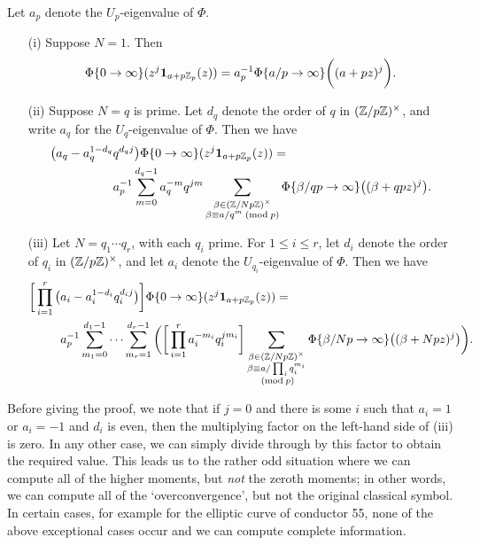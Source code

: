 \documentclass[a4paper,11pt]{article}
\numberwithin{equation}{section}
\begin{document}
\begin{proposition} Let $a_p$ denote the $U_p$-eigenvalue of $\Phi$.
\begin{itemize}
\item[(i)] Suppose $N = 1$. Then
\[
\Phi\{0\rightarrow\infty\}(z^j \mathbf{1}_{a+p\mathbb{Z}_p}(z)) = a_p^{-1}\Phi\{a/p \rightarrow \infty\}\bigg((a+pz)^j\bigg).
\]
\item[(ii)] Suppose $N = q$ is prime. Let $d_q$ denote the order of $q$ in $(\mathbb{Z}/p\mathbb{Z})^\times$, and write $a_q$ for the $U_q$-eigenvalue of $\Phi$. Then we have
\begin{align*}
\big(a_q -a_q^{1-d_q}&q^{d_qj}\big)\Phi\{0\rightarrow\infty\}(z^j \mathbf{1}_{a+p\Zp}(z)) =
\\
& a_p^{-1} \sum_{m = 0}^{d_q-1} a_q^{-m}q^{jm}%
\sum_{\substack{\beta \in (\Z/Np\Z)^\times\\ \beta \equiv a/q^m\newmod{p}}} \Phi\{\beta/qp\rightarrow \infty\}\big((\beta + qpz)^j\big).
\end{align*}

\item[(iii)]Let $N = q_1\cdots q_r$, with each $q_i$ prime. For $1\leq i \leq r$, let $d_i$ denote the order of $q_i$ in $(\mathbb{Z}/p\mathbb{Z})^\times$, and let $a_i$ denote the $U_{q_i}$-eigenvalue of $\Phi$. Then we have 
\begin{align*}
	\bigg[\prod_{i=1}^r\big(&a_i -a_i^{1-d_i}q_i^{d_ij}\big)\bigg]\Phi\{0\rightarrow\infty\}(z^j \mathbf{1}_{a+p\Zp}(z)) =
\\
&a_p^{-1} \sum_{m_1 = 0}^{d_1-1} \cdots \sum_{m_r = 1}^{d_r - 1} \bigg(\bigg[\prod_{i=1}^ra_i^{-m_i}q_i^{jm_i}\bigg]%
\sum_{\substack{\beta \in (\Z/Np\Z)^\times\\ \beta \equiv a/\prod_iq_i^{m_i} \\\newmod{p}}} \Phi\{\beta/Np\rightarrow \infty\}\big((\beta + Npz)^j\big)\bigg).
\end{align*}
\end{itemize}
\end{proposition}

\begin{remark}
Before giving the proof, we note that if $j = 0$ and there is some $i$ such that $a_{i} = 1$ or $a_{i} = -1$ and $d_i$ is even, then the multiplying factor on the left-hand side of (iii) is zero. In any other case, we can simply divide through by this factor to obtain the required value. This leads us to the rather odd situation where we can compute all of the higher moments, but \emph{not} the zeroth moments; in other words, we can compute all of the `overconvergence', but not the original classical symbol. In certain cases, for example for the elliptic curve of conductor 55, none of the above exceptional cases occur and we can compute complete information.
\end{remark}
\end{document}
